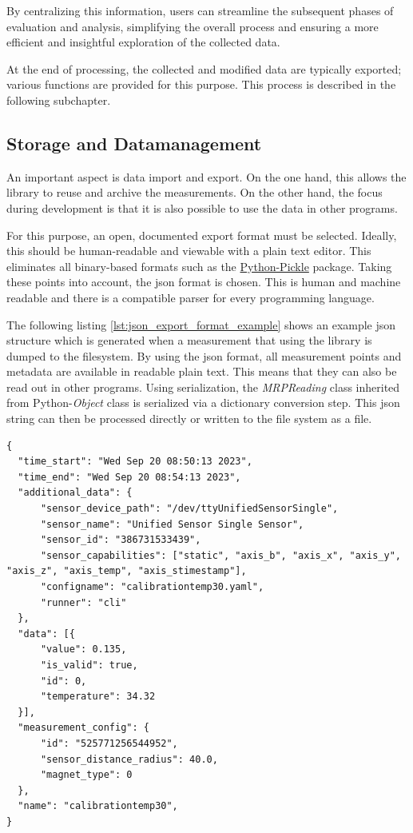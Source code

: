 By centralizing this information, users can streamline the subsequent
phases of evaluation and analysis, simplifying the overall process and
ensuring a more efficient and insightful exploration of the collected
data.

At the end of processing, the collected and modified data are typically
exported; various functions are provided for this purpose. This process
is described in the following subchapter.

\hypertarget{storage-and-datamanagement}{%
\subsection{Storage and
Datamanagement}\label{storage-and-datamanagement}}

An important aspect is data import and export. On the one hand, this
allows the library to reuse and archive the measurements. On the other
hand, the focus during development is that it is also possible to use
the data in other programs.

For this purpose, an open, documented export format must be selected.
Ideally, this should be human-readable and viewable with a plain text
editor. This eliminates all binary-based formats such as the
\href{https://docs.python.org/3/library/pickle.html}{Python-Pickle}
package. Taking these points into account, the \gls{json} format is
chosen. This is human and machine readable and there is a compatible
parser for every programming language.

The following listing \ref{lst:json_export_format_example} shows an
example \gls{json} structure which is generated when a measurement that
using the library is dumped to the filesystem. By using the \gls{json}
format, all measurement points and metadata are available in readable
plain text. This means that they can also be read out in other programs.
Using serialization, the \emph{MRPReading} class inherited from
Python-\emph{Object} class is serialized via a dictionary conversion
step. This \gls{json} string can then be processed directly or written
to the file system as a file.

\begin{lstlisting}[caption={JSON structure of an exported MRPReading based measurement with information about the measurement environment, additional meta-data and raw data value objects}, label=lst:json_export_format_example]
{
  "time_start": "Wed Sep 20 08:50:13 2023",
  "time_end": "Wed Sep 20 08:54:13 2023",
  "additional_data": {
      "sensor_device_path": "/dev/ttyUnifiedSensorSingle",
      "sensor_name": "Unified Sensor Single Sensor",
      "sensor_id": "386731533439",
      "sensor_capabilities": ["static", "axis_b", "axis_x", "axis_y", "axis_z", "axis_temp", "axis_stimestamp"],
      "configname": "calibrationtemp30.yaml",
      "runner": "cli"
  },
  "data": [{
      "value": 0.135,
      "is_valid": true,
      "id": 0,
      "temperature": 34.32
  }],
  "measurement_config": {
      "id": "525771256544952",
      "sensor_distance_radius": 40.0,
      "magnet_type": 0
  },
  "name": "calibrationtemp30",
}
\end{lstlisting}

